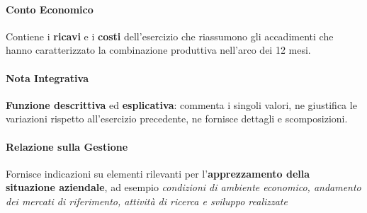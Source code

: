 \documentclass[12pt]{article}
\begin{document}
\paragraph{Conto Economico} Contiene i \textbf{ricavi} e i \textbf{costi} dell'esercizio che riassumono gli accadimenti che hanno caratterizzato la combinazione produttiva nell'arco dei 12 mesi.

\paragraph{Nota Integrativa} \textbf{Funzione descrittiva} ed \textbf{esplicativa}: commenta i singoli valori, ne giustifica le variazioni rispetto all'esercizio precedente, ne fornisce dettagli e scomposizioni.

\paragraph{Relazione sulla Gestione} Fornisce indicazioni su elementi rilevanti per l'\textbf{apprezzamento della situazione aziendale}, ad esempio \textit{condizioni di ambiente economico, andamento dei mercati di riferimento, attività di ricerca e sviluppo realizzate}
\newpage
\end{document}
